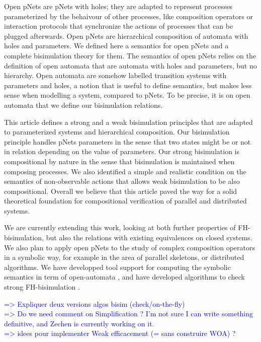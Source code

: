 \documentclass{lmcs}
\newcommand{\ERIC}[1]{\textcolor{blue}{#1}}
\begin{document}
Open pNets are pNets with holes; they are adapted to represent processes parameterized by the behaivour of other processes, like composition operators or interaction 
protocols that synchronize the actions of processes that can be plugged afterwards. Open
pNets are hierarchical composition of automata with holes and parameters. We
defined here a semantics for open pNets and a complete bisimulation theory for them. 
The semantics of open pNets relies on the definition of open automata that are automata with holes and parameters, but no hierarchy. Open automata are somehow labelled transition systems with parameters and holes, a notion that is useful to define semantics, but makes less sense when modelling a system, compared to pNets. To be precise, it is on open automata that we define our bisimulation relations.

This article defines a strong and a weak bisimulation principles that are adapted to parameterized systems and hierarchical composition. Our bisimulation principle handles pNets parameters in the sense that two states might be or not in relation depending on the value of parameters. Our strong  bisimulation is compositional by nature in the sense that bisimulation is maintained when composing processes. We also identified a simple and realistic condition on the semantics of non-observable actions that allows weak bisimulation to be also compositional. Overall we believe that this article paved the way for a solid theoretical foundation for compositional verification of parallel and distributed systems.



We are currently extending this work,  looking at  both further properties of 
FH-bisimulation, but also
the relations with existing equivalences on closed systems.
We also plan to apply open pNets to the study of complex composition
operators in a symbolic way, for example in the area of parallel
skeletons, or distributed algorithms.
We have developped tool support for computing the
symbolic semantics in term of open-automata \cite{QBMZ-AVOCS18}, and have
developed algorithms to check strong FH-bisimulation \cite{hou:hal-02406098}.  


\ERIC{
  =>  Expliquer deux versions algos bisim (check/on-the-fly)\\
=> Do we need comment on Simplification ? I'm not sure I can write
something definitive, and Zechen is currently working on it.\\
=> idees pour implementer Weak efficacement (= sans construire WOA) ?}
\end{document}
